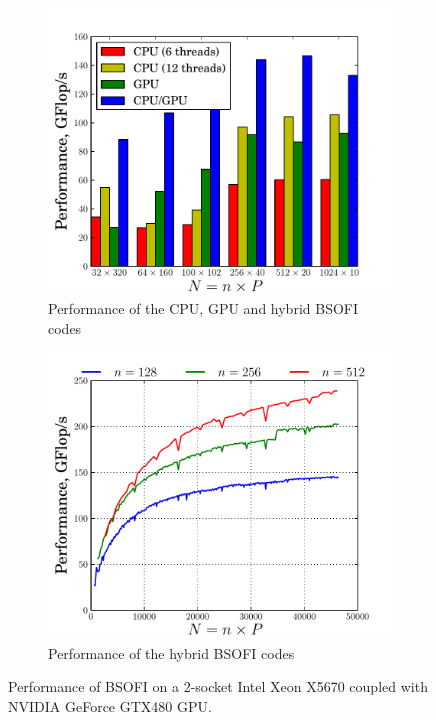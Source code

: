 \documentclass{llncs}
\begin{document}
    \begin{figure}[t]%
      \centering

      \begin{subfigure}[t]{0.49\linewidth}
        \includegraphics[width=\textwidth]{./figs/pdf/BSOFI_BSOI_12}
        \caption{Performance of the CPU, GPU and hybrid BSOFI codes\label{fig:compare_BSOFTRI+BSOI}}
      \end{subfigure}
      \begin{subfigure}[t]{0.49\linewidth}
        \includegraphics[width=\textwidth]{./figs/pdf/BSOFTRI_BSOI}
        \caption{Performance of the hybrid BSOFI codes\label{fig:perf_hybrid_BSOFTRI_BSOI}}
      \end{subfigure}
      \caption{Performance of BSOFI on 
        a 2-socket Intel Xeon X5670 coupled with NVIDIA GeForce GTX480 GPU.} 
      \label{fig:performance_BSO}
    \end{figure}
\end{document}
